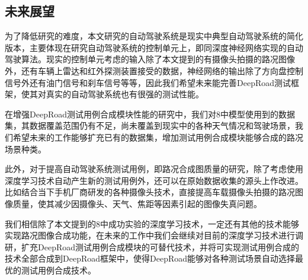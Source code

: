 \begin{conclusions}
\subsection{未来展望}

为了降低研究的难度，本文研究的自动驾驶系统是现实中典型自动驾驶系统的简化版本，主要体现在研究自动驾驶系统的控制单元上，即同深度神经网络实现的自动驾驶算法。现实的控制单元考虑的输入除了本文提到的有摄像头拍摄的路况图像外，还有车辆上雷达和红外探测装置接受的数据，神经网络的输出除了方向盘控制信号外还有油门信号和刹车信号等等，因此我们希望未来能完善DeepRoad测试框架，使其对真实的自动驾驶系统也有很强的测试性能。

在增强DeepRoad测试用例合成模块性能的研究中，我们对8中模型使用到的数据集，其数据覆盖范围仍有不足，尚未覆盖到现实中的各种天气情况和驾驶场景，我们希望未来的工作能够扩充已有的数据集，增加测试用例合成模块能够合成的路况场景种类。

此外，对于提高自动驾驶系统测试用例，即路况合成图质量的研究，除了考虑使用深度学习技术自动产生新的测试用例外，还可以在原始数据收集的源头上作改进。比如结合当下手机厂商研发的各种摄像头技术，直接提高车载摄像头拍摄的路况图像质量，使其减少因摄像头、天气、焦距等因素引起的图像失真问题。

我们相信除了本文提到的8中成功实验的深度学习技术，一定还有其他的技术能够实现路况图像合成功能，在未来的工作中我们会继续对目前的深度学习技术进行调研，扩充DeepRoad测试用例合成模块的可替代技术，并将可实现测试用例合成的技术全部合成到DeepRoad框架中，使得DeepRoad能够对各种测试场景自动选择最优的测试用例合成技术。

\end{conclusions}
